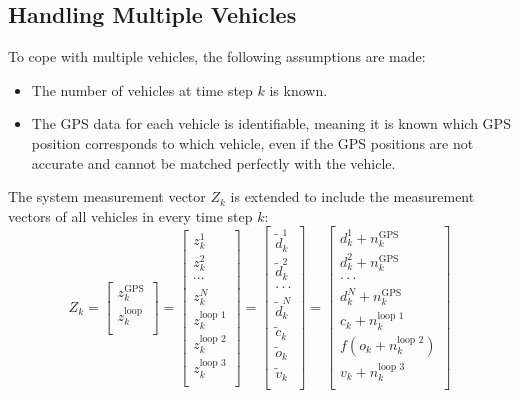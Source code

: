 \subsection{Handling Multiple Vehicles}
To cope with multiple vehicles, the following assumptions are made:
\begin{itemize}
    \item The number of vehicles at time step $k$ is known.
    \item The GPS data for each vehicle is identifiable, meaning it is known which GPS position corresponds to which vehicle, even if the GPS positions are not accurate and cannot be matched perfectly with the vehicle.
\end{itemize}
The system measurement vector \( Z_k \) is extended to include the measurement vectors of all vehicles in every time step $k$:
\begin{equation}\label{system measurement vector}
    Z_k = \begin{bmatrix}
z_k^\text{GPS} \\
z_k^\text{loop}\\
\end{bmatrix}
= \begin{bmatrix}
z_k^1 \\
z_k^2 \\
\cdots \\
z_k^N \\
z_k^\text{loop 1}\\
z_k^\text{loop 2}\\
z_k^\text{loop 3}\\
\end{bmatrix}
= \begin{bmatrix}
\tilde d_k^1 \\
\tilde d_k^2 \\ 
\text{$\cdot \cdot \cdot $} \\
\tilde d_k^N \\ 
\tilde c_k  \\
\tilde o_k  \\
\tilde v_k  \\
\end{bmatrix}
= \begin{bmatrix}
 d_k^1 + n_k^\text{GPS}  \\ 
 d_k^2 + n_k^\text{GPS}  \\ 
\text{$\cdot \cdot \cdot $} \\
 d_k^N + n_k^\text{GPS}  \\
 c_k + n_k^\text{loop 1} \\
 f(o_k + n_k^\text{loop 2}) \\
 v_k + n_k^\text{loop 3} \\
\end{bmatrix}
\end{equation}

